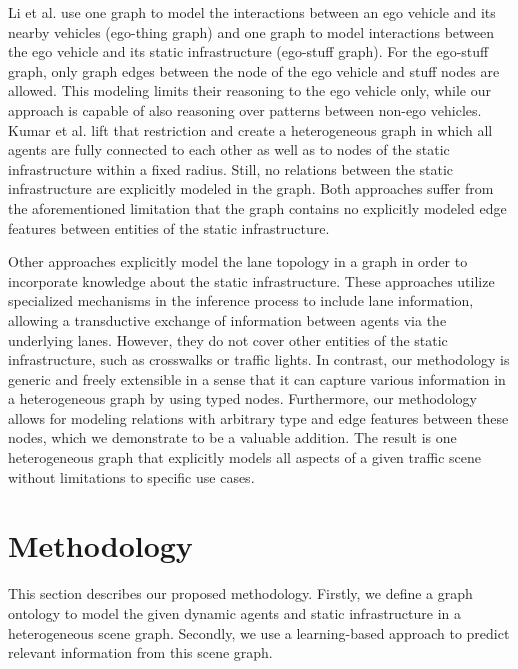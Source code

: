 \documentclass[letterpaper, 10 pt, journal, twoside]{IEEEtran}
\begin{document}
Li et al. \cite{Li2020a} use one graph to model the interactions between an ego vehicle and its nearby vehicles (ego-thing graph) and one graph to model interactions between the ego vehicle and its static infrastructure (ego-stuff graph).
For the ego-stuff graph, only graph edges between the node of the ego vehicle and stuff nodes are allowed.
This modeling limits their reasoning to the ego vehicle only, while our approach is capable of also reasoning over patterns between non-ego vehicles.
Kumar et al. \cite{Kumar2021} lift that restriction and create a heterogeneous graph in which all agents are fully connected to each other as well as to nodes of the static infrastructure within a fixed radius.
Still, no relations between the static infrastructure are explicitly modeled in the graph.
Both approaches suffer from the aforementioned limitation that the graph contains no explicitly modeled edge features between entities of the static infrastructure.

Other approaches \cite{Liang2020, Zeng2021, Khandelwal2020_ARXIV} explicitly model the lane topology in a graph in order to incorporate knowledge about the static infrastructure.
These approaches utilize specialized mechanisms in the inference process to include lane information, allowing a transductive exchange of information between agents via the underlying lanes.
However, they do not cover other entities of the static infrastructure, such as crosswalks or traffic lights.
In contrast, our methodology is generic and freely extensible in a sense that it can capture various information in a heterogeneous graph by using typed nodes.
Furthermore, our methodology allows for modeling relations with arbitrary type and edge features between these nodes, which we demonstrate to be a valuable addition.
The result is one heterogeneous graph that explicitly models all aspects of a given traffic scene without limitations to specific use cases.


\section{Methodology}
This section describes our proposed methodology.
Firstly, we define a graph ontology to model the given dynamic agents and static infrastructure in a heterogeneous scene graph.
Secondly, we use a learning-based approach to predict relevant information from this scene graph.
\end{document}
